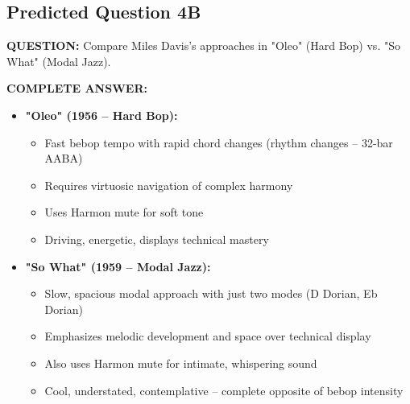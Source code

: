 \documentclass[11pt]{article}
\begin{document}
\subsection*{Predicted Question 4B}

\begin{mdframed}[backgroundcolor=questioncolor!10, linewidth=2pt]
\textbf{\textcolor{questioncolor}{QUESTION:}} Compare Miles Davis's approaches in "Oleo" (Hard Bop) vs. "So What" (Modal Jazz).
\end{mdframed}

\begin{mdframed}[backgroundcolor=answercolor!10, linewidth=2pt]
\textbf{\textcolor{answercolor}{COMPLETE ANSWER:}}

\begin{itemize}[leftmargin=*, nosep]
    \item \textbf{"Oleo" (1956 – Hard Bop):}
    \begin{itemize}[nosep]
        \item Fast bebop tempo with rapid chord changes (rhythm changes – 32-bar AABA)
        \item Requires virtuosic navigation of complex harmony
        \item Uses Harmon mute for soft tone
        \item Driving, energetic, displays technical mastery
    \end{itemize}
    
    \item \textbf{"So What" (1959 – Modal Jazz):}
    \begin{itemize}[nosep]
        \item Slow, spacious modal approach with just two modes (D Dorian, Eb Dorian)
        \item Emphasizes melodic development and space over technical display
        \item Also uses Harmon mute for intimate, whispering sound
        \item Cool, understated, contemplative – complete opposite of bebop intensity
    \end{itemize}
\end{itemize}

\vspace{5pt}
\end{mdframed}
\end{document}
